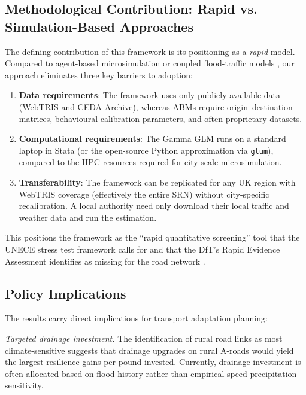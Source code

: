 \documentclass[review]{elsarticle}
\begin{document}
\subsection{Methodological Contribution: Rapid vs. Simulation-Based Approaches}
\label{sec:disc:method}

The defining contribution of this framework is its positioning as a \textit{rapid} model. Compared to agent-based microsimulation \citep{huang2022overview,he2026flood} or coupled flood-traffic models \citep{pregnolato2017depth,farahmand2024integrating}, our approach eliminates three key barriers to adoption:

\begin{enumerate}
    \item \textbf{Data requirements}: The framework uses only publicly available data (WebTRIS and CEDA Archive), whereas ABMs require origin--destination matrices, behavioural calibration parameters, and often proprietary datasets.
    \item \textbf{Computational requirements}: The Gamma GLM runs on a standard laptop in Stata (or the open-source Python approximation via \texttt{glum}), compared to the HPC resources required for city-scale microsimulation.
    \item \textbf{Transferability}: The framework can be replicated for any UK region with WebTRIS coverage (effectively the entire SRN) without city-specific recalibration. A local authority need only download their local traffic and weather data and run the estimation.
\end{enumerate}

This positions the framework as the ``rapid quantitative screening'' tool that the UNECE stress test framework calls for \citep{unece2024stress} and that the DfT's Rapid Evidence Assessment identifies as missing for the road network \citep{dft2024rea}.

\subsection{Policy Implications}
\label{sec:disc:policy}

The results carry direct implications for transport adaptation planning:

\textit{Targeted drainage investment.} The identification of rural road links as most climate-sensitive suggests that drainage upgrades on rural A-roads would yield the largest resilience gains per pound invested. Currently, drainage investment is often allocated based on flood history rather than empirical speed-precipitation sensitivity.
\end{document}
